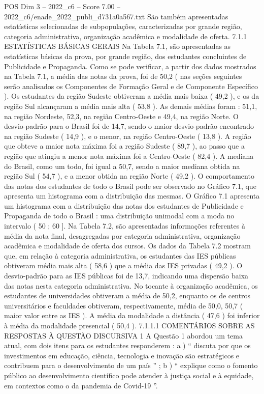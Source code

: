 \begin{textsample}{POS Dim 3 – 2022\_c6 – Score 7.00 – 2022\_c6/enade\_2022\_publi\_d731a0a567.txt}
São também apresentadas estatísticas selecionadas de subpopulações, caracterizadas por grande região, categoria administrativa, organização acadêmica e modalidade de oferta. 7.1.1 ESTATÍSTICAS BÁSICAS GERAIS Na Tabela 7.1, são apresentadas as estatísticas básicas da prova, por grande região, dos estudantes concluintes de Publicidade e Propaganda.
Como se pode verificar, a partir dos dados mostrados na Tabela 7.1, a média das notas da prova, foi de 50,2 ( nas seções seguintes serão analisados os Componentes de Formação Geral e de Componente Específico ).
Os estudantes da região Sudeste obtiveram a média mais baixa ( 49,2 ), e os da região Sul alcançaram a média mais alta ( 53,8 ).
As demais médias foram : 51,1, na região Nordeste, 52,3, na região Centro-Oeste e 49,4, na região Norte.
O desvio-padrão para o Brasil foi de 14,7, sendo o maior desvio-padrão encontrado na região Sudeste ( 14,9 ), e o menor, na região Centro-Oeste ( 13,8 ).
A região que obteve a maior nota máxima foi a região Sudeste ( 89,7 ), ao passo que a região que atingiu a menor nota máxima foi a Centro-Oeste ( 82,4 ).
A mediana do Brasil, como um todo, foi igual a 50,7, sendo a maior mediana obtida na região Sul ( 54,7 ), e a menor obtida na região Norte ( 49,2 ).
O comportamento das notas dos estudantes de todo o Brasil pode ser observado no Gráfico 7.1, que apresenta um histograma com a distribuição das mesmas.
O Gráfico 7.1 apresenta um histograma com a distribuição das notas dos estudantes de Publicidade e Propaganda de todo o Brasil : uma distribuição unimodal com a moda no intervalo ( 50 ; 60 ].
Na Tabela 7.2, são apresentadas informações referentes à média da nota final, desagregadas por categoria administrativa, organização acadêmica e modalidade de oferta dos cursos.
Os dados da Tabela 7.2 mostram que, em relação à categoria administrativa, os estudantes das IES públicas obtiveram média mais alta ( 58,6 ) que a média das IES privadas ( 49,2 ).
O desvio-padrão para as IES públicas foi de 13,7, indicando uma dispersão baixa das notas nesta categoria administrativa.
No tocante à organização acadêmica, os estudantes de universidades obtiveram a média de 50,2, enquanto os de centros universitários e faculdades obtiveram, respectivamente, média de 50,0, 50,7 ( maior valor entre as IES ).
A média da modalidade a distância ( 47,6 ) foi inferior à média da modalidade presencial ( 50,4 ). 7.1.1.1 COMENTÁRIOS SOBRE AS RESPOSTAS À QUESTÃO DISCURSIVA 1 A Questão 1 abordou um tema atual, com dois itens para os estudantes responderem : a ) “ discuta por que os investimentos em educação, ciência, tecnologia e inovação são estratégicos e contribuem para o desenvolvimento de um país ” ; b ) “ explique como o fomento público ao desenvolvimento científico pode atender à justiça social e à equidade, em contextos como o da pandemia de Covid-19 ”.

\end{textsample}
